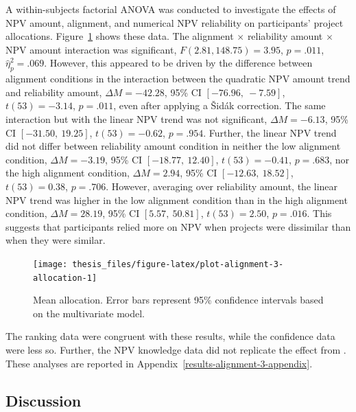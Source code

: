 \documentclass[a4paper, nobind, dvipsnames]{templates/ociamthesis}
\theoremstyle{definition}
\theoremstyle{definition}
\theoremstyle{definition}
\theoremstyle{definition}
\theoremstyle{remark}
\begin{document}
A within-subjects factorial ANOVA was conducted to investigate the effects of
NPV amount, alignment, and numerical NPV reliability on participants' project
allocations. Figure~\ref{fig:plot-alignment-3-allocation} shows these data. The
alignment \(\times\) reliability amount \(\times\) NPV amount interaction was
significant,
\(F(2.81, 148.75) = 3.95\), \(p = .011\), \(\hat{\eta}^2_p = .069\).
However, this appeared to be driven by the difference between alignment
conditions in the interaction between the quadratic NPV amount trend and
reliability amount,
\(\Delta M = -42.28\), 95\% CI \([-76.96,~-7.59]\), \(t(53) = -3.14\), \(p = .011\), even after
applying a Šidák correction. The same interaction but with the linear NPV trend
was not significant,
\(\Delta M = -6.13\), 95\% CI \([-31.50,~19.25]\), \(t(53) = -0.62\), \(p = .954\). Further, the linear
NPV trend did not differ between reliability amount condition in neither the low
alignment condition, \(\Delta M = -3.19\), 95\% CI \([-18.77,~12.40]\), \(t(53) = -0.41\), \(p = .683\), nor
the high alignment condition,
\(\Delta M = 2.94\), 95\% CI \([-12.63,~18.52]\), \(t(53) = 0.38\), \(p = .706\). However, averaging over
reliability amount, the linear NPV trend was higher in the low alignment
condition than in the high alignment condition,
\(\Delta M = 28.19\), 95\% CI \([5.57,~50.81]\), \(t(53) = 2.50\), \(p = .016\). This suggests that
participants relied more on NPV when projects were dissimilar than when they
were similar.



\begin{figure}
\texttt{[image: thesis\_files/figure-latex/plot-alignment-3-allocation-1]} \caption{Mean allocation. Error bars represent 95\% confidence intervals based on the multivariate model.}\label{fig:plot-alignment-3-allocation}
\end{figure}

The ranking data were congruent with these results, while the confidence data
were less so. Further, the NPV knowledge data did not replicate the effect from
\textcite[Study 1]{long2018}. These analyses are reported in
Appendix~\ref{results-alignment-3-appendix}.

\subsection{Discussion}
\end{document}
